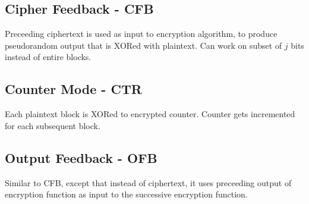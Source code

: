 \subsection{Cipher Feedback - CFB}
\begin{figure}
\vspace{-60pt}
\end{figure}
Preceeding ciphertext is used as input to encryption algorithm, to produce pseudorandom output that is XORed with plaintext. Can work on subset of $j$ bits instead of entire blocks.


\subsection{Counter Mode - CTR}
\begin{figure}
\vspace{-50pt}
\end{figure}
Each plaintext block is XORed to encrypted counter. Counter gets incremented for each subsequent block.


\begin{figure}
\vspace{-50pt}
\end{figure}
\subsection{Output Feedback - OFB}
Similar to CFB, except that instead of ciphertext, it uses preceeding output of encryption function as input to the successive encryption function.

